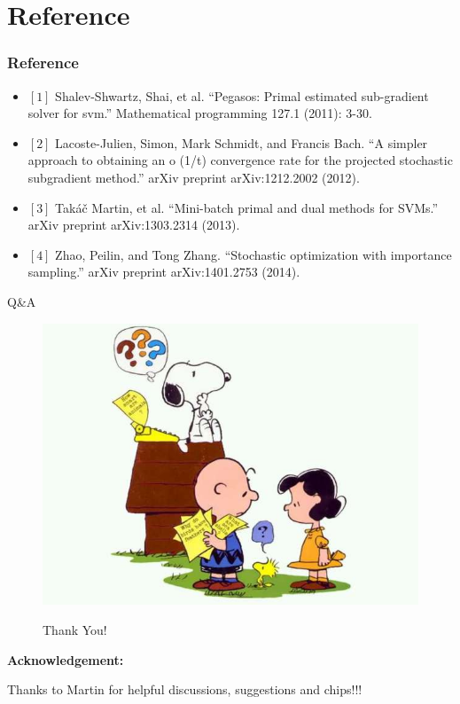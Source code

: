 \section{Reference}
\begin{frame}[fragile]
\frametitle{Reference}
\begin{itemize}
\item[] $\left[1\right]$ Shalev-Shwartz, Shai, et al. ``Pegasos: Primal estimated sub-gradient solver for svm.'' Mathematical programming 127.1 (2011): 3-30. 

\item[] $\left[2\right]$ Lacoste-Julien, Simon, Mark Schmidt, and Francis Bach. ``A simpler approach to obtaining an o (1/t) convergence rate for the projected stochastic subgradient method.'' arXiv preprint arXiv:1212.2002 (2012).

\item[] $\left[3\right]$  Tak\'a\v{c} Martin, et al. ``Mini-batch primal and dual methods for SVMs.'' arXiv preprint arXiv:1303.2314 (2013).
\item[] $\left[4\right]$ Zhao, Peilin, and Tong Zhang. ``Stochastic optimization with importance sampling.'' arXiv preprint arXiv:1401.2753 (2014).
\end{itemize}
\end{frame}

\begin{frame}{Q\&A}
\begin{figure}[htbp]
    \begin{multicols}{2}
    \includegraphics[height=0.4\textheight]{images/question.jpg}

    \Huge{Thank You!}
    \end{multicols}
\end{figure}

\textbf{Acknowledgement:}

Thanks to Martin for helpful discussions, suggestions and chips!!!

\end{frame}


